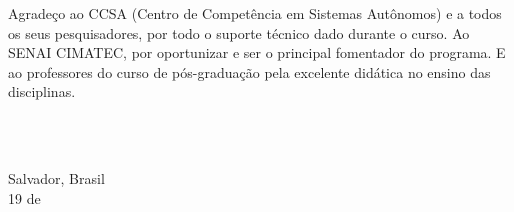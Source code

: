 \begin{agradecimentos}

    Agradeço ao CCSA (Centro de Competência em Sistemas Autônomos) e a todos os seus pesquisadores, por todo o suporte técnico dado durante o curso.
    Ao SENAI CIMATEC, por oportunizar e ser o principal fomentador do programa.  
    E ao professores do curso de pós-graduação pela excelente didática no ensino das disciplinas.




\ \\
\ \\

\noindent

\raggedright
Salvador, Brasil \\ 
19 de \mesdeano \\

\raggedleft
\theauthor\\ \theauthorr\\ \theauthorrr\\ \theauthorrrr\\

\end{agradecimentos}
